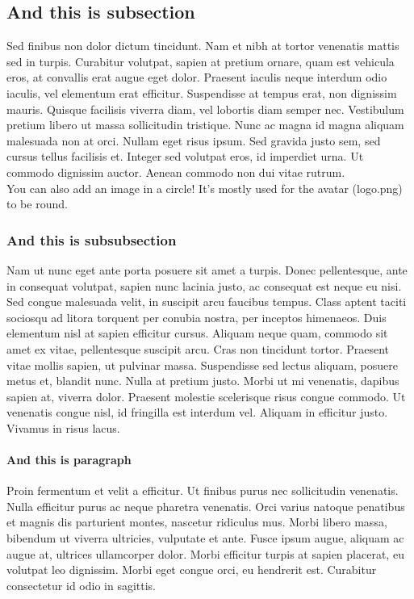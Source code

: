 \documentclass[12pt]{amari}
\begin{document}
\subsection{And this is subsection}
Sed finibus non dolor dictum tincidunt. Nam et nibh at tortor venenatis mattis sed in turpis. Curabitur volutpat, sapien at pretium ornare, quam est vehicula eros, at convallis erat augue eget dolor. Praesent iaculis neque interdum odio iaculis, vel elementum erat efficitur. Suspendisse at tempus erat, non dignissim mauris. Quisque facilisis viverra diam, vel lobortis diam semper nec. Vestibulum pretium libero ut massa sollicitudin tristique. Nunc ac magna id magna aliquam malesuada non at orci. Nullam eget risus ipsum. Sed gravida justo sem, sed cursus tellus facilisis et. Integer sed volutpat eros, id imperdiet urna. Ut commodo dignissim auctor. Aenean commodo non dui vitae rutrum.\\

You can also add an image in a circle! It's mostly used for the avatar (logo.png) to be round.


\subsubsection{And this is subsubsection}
Nam ut nunc eget ante porta posuere sit amet a turpis. Donec pellentesque, ante in consequat volutpat, sapien nunc lacinia justo, ac consequat est neque eu nisi. Sed congue malesuada velit, in suscipit arcu faucibus tempus. Class aptent taciti sociosqu ad litora torquent per conubia nostra, per inceptos himenaeos. Duis elementum nisl at sapien efficitur cursus. Aliquam neque quam, commodo sit amet ex vitae, pellentesque suscipit arcu. Cras non tincidunt tortor. Praesent vitae mollis sapien, ut pulvinar massa. Suspendisse sed lectus aliquam, posuere metus et, blandit nunc. Nulla at pretium justo. Morbi ut mi venenatis, dapibus sapien at, viverra dolor. Praesent molestie scelerisque risus congue commodo. Ut venenatis congue nisl, id fringilla est interdum vel. Aliquam in efficitur justo. Vivamus in risus lacus.

\paragraph{And this is paragraph}
Proin fermentum et velit a efficitur. Ut finibus purus nec sollicitudin venenatis. Nulla efficitur purus ac neque pharetra venenatis. Orci varius natoque penatibus et magnis dis parturient montes, nascetur ridiculus mus. Morbi libero massa, bibendum ut viverra ultricies, vulputate et ante. Fusce ipsum augue, aliquam ac augue at, ultrices ullamcorper dolor. Morbi efficitur turpis at sapien placerat, eu volutpat leo dignissim. Morbi eget congue orci, eu hendrerit est. Curabitur consectetur id odio in sagittis.
\end{document}

